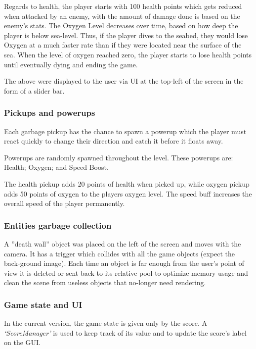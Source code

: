 \documentclass[11pt]{article}
\begin{document}
Regards to health, the player starts with 100 health points which gets reduced when attacked by an enemy, with the amount of damage done is based on the enemy’s stats. The Oxygen Level decreases over time, based on how deep the player is below sea-level. Thus, if the player dives to the seabed, they would lose Oxygen at a much faster rate than if they were located near the surface of the sea. When the level of oxygen reached zero, the player starts to lose health points until eventually dying and ending the game.

The above were displayed to the user via UI at the top-left of the screen in the form of a slider bar.

\subsubsection{Pickups and powerups}
Each garbage pickup has the chance to spawn a powerup which the player must react quickly to change their direction and catch it before it floats away.

Powerups are randomly spawned throughout the level. These powerups are: Health; Oxygen; and Speed Boost.

The health pickup adds 20 points of health when picked up, while oxygen pickup adds 50 points of oxygen to the players oxygen level. The speed buff increases the overall speed of the player permanently.

\subsubsection{Entities garbage collection}
A ”death wall” object was placed on the left of the screen and moves with the camera. It has a trigger which collides with all the game objects (expect the back-ground image). Each time an object is far enough from the user’s point of view it is deleted or sent back to its relative pool to optimize memory usage and clean the scene from useless objects that no-longer need rendering.

\subsubsection{Game state and UI}
In the current version, the game state is given only by the score. A \textit{‘ScoreManager’} is used to keep track of its value and to update the score’s label on the GUI.
\end{document}
